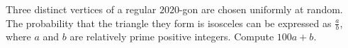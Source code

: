 Three distinct vertices of a regular $2020$-gon are chosen uniformly at random. The probability that the triangle they form is isosceles can be expressed as $\frac{a}{b}$, where $a$ and $b$ are relatively prime positive integers. Compute $100a + b$.
